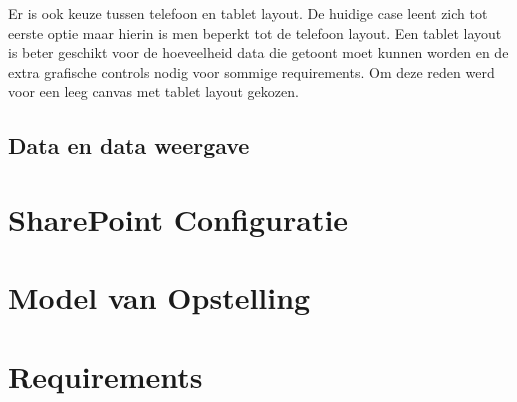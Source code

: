 Er is ook keuze tussen telefoon en tablet layout. De huidige case leent zich tot eerste optie maar hierin is men beperkt tot de telefoon layout. Een tablet layout is beter geschikt voor de hoeveelheid data die getoont moet kunnen worden en de extra grafische controls nodig voor sommige requirements. Om deze reden werd voor een leeg canvas met tablet layout gekozen.

\subsection{Data en data weergave}



\section{SharePoint Configuratie}



\section{Model van Opstelling}



\section{Requirements}


